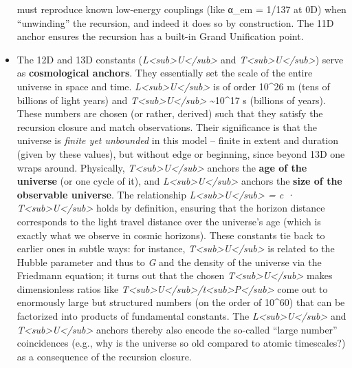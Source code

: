 \documentclass[
]{article}
\begin{document}
\begin{itemize}
  must reproduce known low-energy couplings (like α\_em = 1/137 at 0D)
  when ``unwinding'' the recursion, and indeed it does so by
  construction. The 11D anchor ensures the recursion has a built-in
  Grand Unification point.
\item
  The 12D and 13D constants
  (\emph{L\textless sub\textgreater U\textless/sub\textgreater{}} and
  \emph{T\textless sub\textgreater U\textless/sub\textgreater{}}) serve
  as \textbf{cosmological anchors}. They essentially set the scale of
  the entire universe in space and time.
  \emph{L\textless sub\textgreater U\textless/sub\textgreater{}} is of
  order 10\^{}26 m (tens of billions of light years) and
  \emph{T\textless sub\textgreater U\textless/sub\textgreater{}}
  \textasciitilde10\^{}17 s (billions of years). These numbers are
  chosen (or rather, derived) such that they satisfy the recursion
  closure and match observations. Their significance is that the
  universe is \emph{finite yet unbounded} in this model -- finite in
  extent and duration (given by these values), but without edge or
  beginning, since beyond 13D one wraps around. Physically,
  \emph{T\textless sub\textgreater U\textless/sub\textgreater{}} anchors
  the \textbf{age of the universe} (or one cycle of it), and
  \emph{L\textless sub\textgreater U\textless/sub\textgreater{}} anchors
  the \textbf{size of the observable universe}. The relationship
  \emph{L\textless sub\textgreater U\textless/sub\textgreater{} = c ·
  T\textless sub\textgreater U\textless/sub\textgreater{}} holds by
  definition\hspace{0pt}, ensuring that the horizon distance corresponds
  to the light travel distance over the universe's age (which is exactly
  what we observe in cosmic horizons). These constants tie back to
  earlier ones in subtle ways: for instance,
  \emph{T\textless sub\textgreater U\textless/sub\textgreater{}} is
  related to the Hubble parameter and thus to \emph{G} and the density
  of the universe via the Friedmann equation\hspace{0pt}; it turns out
  that the chosen
  \emph{T\textless sub\textgreater U\textless/sub\textgreater{}} makes
  dimensionless ratios like
  \emph{T\textless sub\textgreater U\textless/sub\textgreater/t\textless sub\textgreater P\textless/sub\textgreater{}}
  come out to enormously large but structured numbers (on the order of
  10\^{}60) that can be factorized into products of fundamental
  constants. The
  \emph{L\textless sub\textgreater U\textless/sub\textgreater{}} and
  \emph{T\textless sub\textgreater U\textless/sub\textgreater{}} anchors
  thereby also encode the so-called ``large number'' coincidences (e.g.,
  why is the universe so old compared to atomic timescales?) as a
  consequence of the recursion closure.
\end{itemize}
\end{document}
